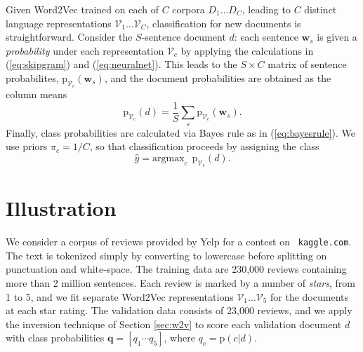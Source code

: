 \documentclass[11pt]{article}
\begin{document}


 
Given Word2Vec trained on each of $C$ corpora $D_1 \ldots D_C$, leading to $C$
distinct language representations $\mathcal{V}_1 \dots \mathcal{V}_C$, classification for new documents is straightforward.  Consider the $S$-sentence document $d$:  each sentence $\mathbf{w}_s$ is given a {\it probability} under each representation $\mathcal{V}_c$ by applying the calculations in (\ref{eq:skipgram}) and (\ref{eq:neuralnet}).  This leads to the $S \times C$ matrix of sentence probabilites, $\mathrm{p}_{\mathcal{V}_c}(\mathbf{w}_s)$, and the document probabilities are obtained as the column means
\begin{equation}
\mathrm{p}_{\mathcal{V}_c}(d) = \frac{1}{S}\sum_s \mathrm{p}_{\mathcal{V}_c}(\mathbf{w}_s).
\end{equation}
Finally, class probabilities are calculated via Bayes rule as in (\ref{eq:bayesrule}).  We use priors $\pi_c = 1/C$, so that classification proceeds by assigning the class
\begin{equation}\label{eq:class}
\hat y = \mathrm{argmax}_c ~~\mathrm{p}_{\mathcal{V}_c}(d).
\end{equation}



\section{Illustration}

We consider a corpus of reviews provided by Yelp for a contest on {\tt
kaggle.com}.  The text is tokenized simply by converting to lowercase before splitting on punctuation and white-space.  The training data are 230,000 reviews containing more than 2
million sentences. Each review is marked by a number of {\it stars}, from 1
to 5, and we fit separate Word2Vec representations $\mathcal{V}_1 \ldots
\mathcal{V}_5$ for the documents at each star rating.  The validation data
consists of 23,000 reviews, and we apply the inversion technique of Section
\ref{sec:w2v} to score each validation document $d$ with class probabilities
$\mathbf{q} = [q_1 \cdots q_5]$, where $q_c = \mathrm{p}(c|d)$.
\end{document}
